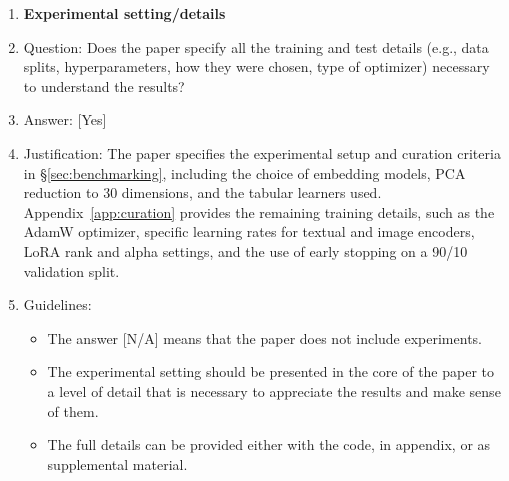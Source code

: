 \documentclass{llmxive}
\providecommand{\answerYes}[1][]{[Yes]#1}
\providecommand{\answerNA}[1][]{[N/A]#1}
\begin{document}
\begin{enumerate}
\item {\bf Experimental setting/details}
    \item[] Question: Does the paper specify all the training and test details (e.g., data splits, hyperparameters, how they were chosen, type of optimizer) necessary to understand the results?
    \item[] Answer: \answerYes{}
    \item[] Justification: The paper specifies the experimental setup and curation criteria in \S\ref{sec:benchmarking}, including the choice of embedding models, PCA reduction to 30 dimensions, and the tabular learners used. Appendix~\ref{app:curation} provides the remaining training details, such as the AdamW optimizer, specific learning rates for textual and image encoders, LoRA rank and alpha settings, and the use of early stopping on a 90/10 validation split.
    \item[] Guidelines:
    \begin{itemize}
        \item The answer \answerNA{} means that the paper does not include experiments.
        \item The experimental setting should be presented in the core of the paper to a level of detail that is necessary to appreciate the results and make sense of them.
        \item The full details can be provided either with the code, in appendix, or as supplemental material.
    \end{itemize}


\end{enumerate}
\end{document}
